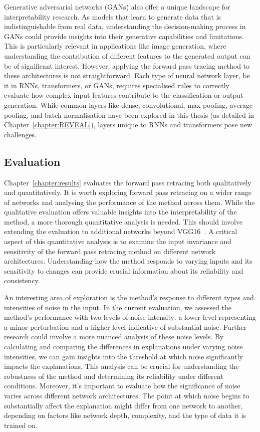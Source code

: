 Generative adversarial networks (GANs) also offer a unique landscape for interpretability research. As models that learn to generate data that is indistinguishable from real data, understanding the decision-making process in GANs could provide insights into their generative capabilities and limitations. This is particularly relevant in applications like image generation, where understanding the contribution of different features to the generated output can be of significant interest. However, applying the forward pass tracing method to these architectures is not straightforward. Each type of neural network layer, be it in RNNs, transformers, or GANs, requires specialised rules to correctly evaluate how complex input features contribute to the classification or output generation. While common layers like dense, convolutional, max pooling, average pooling, and batch normalisation have been explored in this thesis (as detailed in Chapter~\ref{chapter:REVEAL}), layers unique to RNNs and transformers pose new challenges. 

\subsection{Evaluation}
\label{evl}
Chapter~\ref{chapter:results} evaluates the forward pass retracing both qualitatively and quantitatively. It is worth exploring forward pass retracing on a wider range of networks and analysing the performance of the method across them. While the qualitative evaluation offers valuable insights into the interpretability of the method, a more thorough quantitative analysis is needed. This should involve extending the evaluation to additional networks beyond VGG16~\cite{SimonyanZ14a}. A critical aspect of this quantitative analysis is to examine the input invariance and sensitivity of the forward pass retracing method on different network architectures. Understanding how the method responds to varying inputs and its sensitivity to changes can provide crucial information about its reliability and consistency.

An interesting area of exploration is the method's response to different types and intensities of noise in the input. In the current evaluation, we assessed the method's performance with two levels of noise intensity: a lower level representing a minor perturbation and a higher level indicative of substantial noise. Further research could involve a more nuanced analysis of these noise levels. By calculating and comparing the differences in explanations under varying noise intensities, we can gain insights into the threshold at which noise significantly impacts the explanations. This analysis can be crucial for understanding the robustness of the method and determining its reliability under different conditions. Moreover, it's important to evaluate how the significance of noise varies across different network architectures. The point at which noise begins to substantially affect the explanation might differ from one network to another, depending on factors like network depth, complexity, and the type of data it is trained on. 

